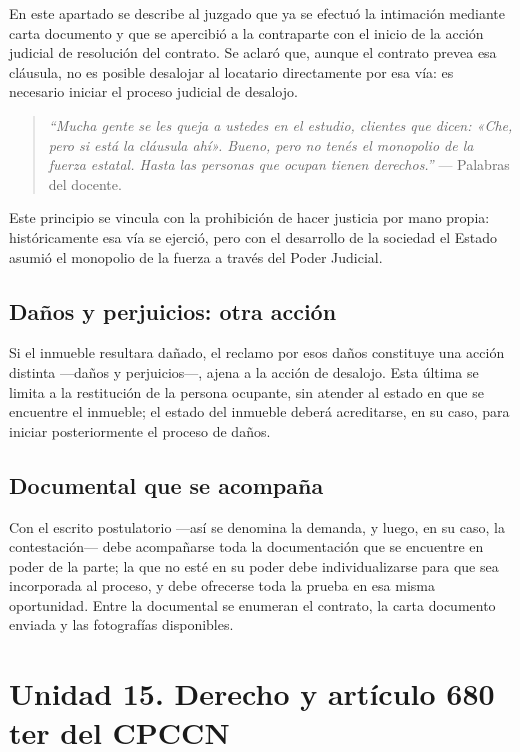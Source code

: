 \documentclass[12pt,oneside]{book}
\begin{document}
En este apartado se describe al juzgado que ya se efectuó la intimación mediante carta documento y que se apercibió a la contraparte con el inicio de la acción judicial de resolución del contrato. Se aclaró que, aunque el contrato prevea esa cláusula, no es posible desalojar al locatario directamente por esa vía: es necesario iniciar el proceso judicial de desalojo.

\begin{quote}
\textit{``Mucha gente se les queja a ustedes en el estudio, clientes que dicen: «Che, pero si está la cláusula ahí». Bueno, pero no tenés el monopolio de la fuerza estatal. Hasta las personas que ocupan tienen derechos.''} --- Palabras del docente.
\end{quote}

Este principio se vincula con la prohibición de hacer justicia por mano propia: históricamente esa vía se ejerció, pero con el desarrollo de la sociedad el Estado asumió el monopolio de la fuerza a través del Poder Judicial.

\subsection*{Daños y perjuicios: otra acción}

Si el inmueble resultara dañado, el reclamo por esos daños constituye una acción distinta —daños y perjuicios—, ajena a la acción de desalojo. Esta última se limita a la restitución de la persona ocupante, sin atender al estado en que se encuentre el inmueble; el estado del inmueble deberá acreditarse, en su caso, para iniciar posteriormente el proceso de daños.

\subsection*{Documental que se acompaña}

Con el escrito postulatorio —así se denomina la demanda, y luego, en su caso, la contestación— debe acompañarse toda la documentación que se encuentre en poder de la parte; la que no esté en su poder debe individualizarse para que sea incorporada al proceso, y debe ofrecerse toda la prueba en esa misma oportunidad. Entre la documental se enumeran el contrato, la carta documento enviada y las fotografías disponibles.

\section*{Unidad 15. Derecho y artículo 680 ter del CPCCN}
\end{document}
